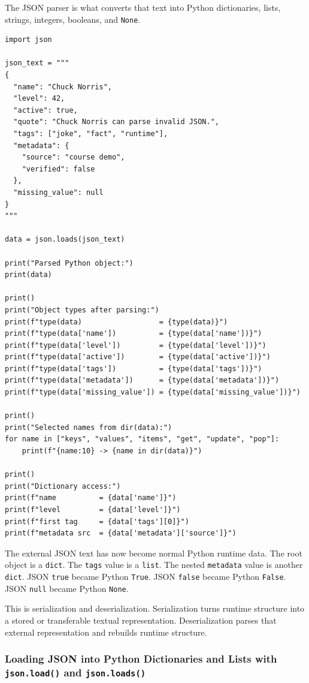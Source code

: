 The JSON parser is what converts that text into Python dictionaries, lists, strings, integers, booleans, and \texttt{None}.

\begin{verbatim}
import json

json_text = """
{
  "name": "Chuck Norris",
  "level": 42,
  "active": true,
  "quote": "Chuck Norris can parse invalid JSON.",
  "tags": ["joke", "fact", "runtime"],
  "metadata": {
    "source": "course demo",
    "verified": false
  },
  "missing_value": null
}
"""

data = json.loads(json_text)

print("Parsed Python object:")
print(data)

print()
print("Object types after parsing:")
print(f"type(data)                  = {type(data)}")
print(f"type(data['name'])          = {type(data['name'])}")
print(f"type(data['level'])         = {type(data['level'])}")
print(f"type(data['active'])        = {type(data['active'])}")
print(f"type(data['tags'])          = {type(data['tags'])}")
print(f"type(data['metadata'])      = {type(data['metadata'])}")
print(f"type(data['missing_value']) = {type(data['missing_value'])}")

print()
print("Selected names from dir(data):")
for name in ["keys", "values", "items", "get", "update", "pop"]:
    print(f"{name:10} -> {name in dir(data)}")

print()
print("Dictionary access:")
print(f"name          = {data['name']}")
print(f"level         = {data['level']}")
print(f"first tag     = {data['tags'][0]}")
print(f"metadata src  = {data['metadata']['source']}")
\end{verbatim}

The external JSON text has now become normal Python runtime data. The root object is a \texttt{dict}. The \texttt{tags} value is a \texttt{list}. The nested \texttt{metadata} value is another \texttt{dict}. JSON \texttt{true} became Python \texttt{True}. JSON \texttt{false} became Python \texttt{False}. JSON \texttt{null} became Python \texttt{None}.

This is serialization and deserialization. Serialization turns runtime structure into a stored or transferable textual representation. Deserialization parses that external representation and rebuilds runtime structure.

\subsubsection{Loading JSON into Python Dictionaries and Lists with \texttt{json.load()} and \texttt{json.loads()}}

